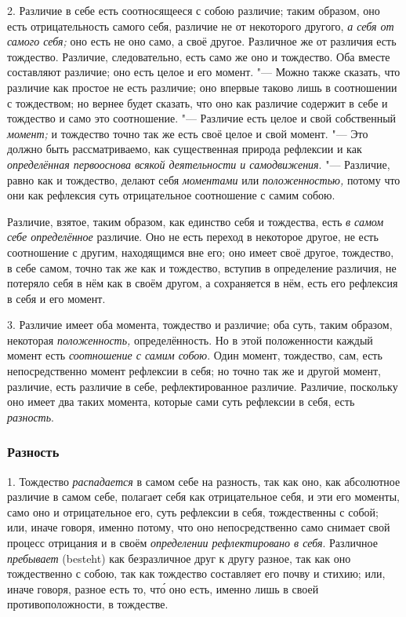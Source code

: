 2. Различие в себе есть соотносящееся с собою различие; таким образом, оно
есть отрицательность самого себя, различие не от некоторого другого,
{\em а себя от самого себя;} оно есть не оно само, а
своё другое. Различное же от различия есть тождество. Различие,
следовательно, есть само же оно и тождество. Оба вместе составляют
различие; оно есть целое и его момент. "--- Можно также сказать, что различие
как простое не есть различие; оно впервые таково лишь в соотношении с
тождеством; но вернее будет сказать, что оно как различие содержит в себе и
тождество и само это соотношение. "--- Различие есть целое и свой собственный
{\em момент;} и тождество точно так же есть своё целое
и свой момент. "--- Это должно быть рассматриваемо, как существенная природа
рефлексии и как {\em определённая первооснова всякой
деятельности и самодвижения}. "--- Различие, равно как и тождество, делают
себя {\em моментами} или
{\em положенностью,} потому что они как рефлексия суть
отрицательное соотношение с самим собою.

Различие, взятое, таким образом, как единство себя и тождества, есть
{\em в самом себе определённое} различие. Оно не есть
переход в некоторое другое, не есть соотношение с другим, находящимся вне
его; оно имеет своё другое, тождество, в себе самом, точно так же как и
тождество, вступив в определение различия, не потеряло себя в нём как в
своём другом, а сохраняется в нём, есть его рефлексия в себя и его момент.

3. Различие имеет оба момента, тождество и различие; оба суть, таким
образом, некоторая {\em положенность,} определённость.
Но в этой положенности каждый момент есть
{\em соотношение с самим собою}. Один момент,
тождество, сам, есть непосредственно момент рефлексии в себя; но точно так
же и другой момент, различие, есть различие в себе, рефлектированное
различие. Различие, поскольку оно имеет два таких момента, которые сами
суть рефлексии в себя, есть {\em разность}.

\subsubsection{Разность}
1. Тождество {\em распадается} в самом себе на разность, так как
оно, как абсолютное различие в самом себе, полагает себя как отрицательное
себя, и эти его моменты, само оно и отрицательное его, суть рефлексии в
себя, тождественны с собой; или, иначе говоря, именно потому, что оно
непосредственно само снимает свой процесс отрицания и в своём
{\em определении рефлектировано в себя}. Различное
{\em пребывает} (besteht) как безразличное друг к другу
разное, так как оно тождественно с собою, так как тождество составляет его
почву и стихию; или, иначе говоря, разное есть то, чт\'{о} оно есть, именно
лишь в своей противоположности, в тождестве.

